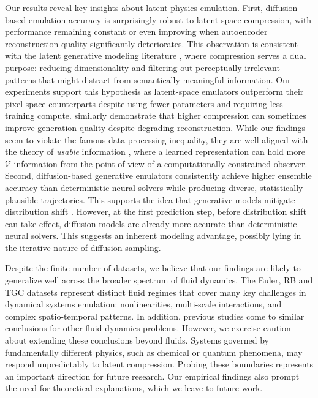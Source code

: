 Our results reveal key insights about latent physics emulation. First, diffusion-based emulation accuracy is surprisingly robust to latent-space compression, with performance remaining constant or even improving when autoencoder reconstruction quality significantly deteriorates. This observation is consistent with the latent generative modeling literature \cite{rombach2022highresolution, dieleman2025generative}, where compression serves a dual purpose: reducing dimensionality and filtering out perceptually irrelevant patterns that might distract from semantically meaningful information. Our experiments support this hypothesis as latent-space emulators outperform their pixel-space counterparts despite using fewer parameters and requiring less training compute. \textcite{yao2025reconstruction} similarly demonstrate that higher compression can sometimes improve generation quality despite degrading reconstruction. While our findings seem to violate the famous data processing inequality, they are well aligned with the theory of \emph{usable} information \cite{xu2020theory}, where a learned representation can hold more $\mathcal{V}$-information from the point of view of a computationally constrained observer. Second, diffusion-based generative emulators consistently achieve higher ensemble accuracy than deterministic neural solvers while producing diverse, statistically plausible trajectories. This supports the idea that generative models mitigate distribution shift \cite{lippe2023pderefiner, cachay2023dyffusion, kohl2024benchmarking, shysheya2024conditional, huang2024diffusionpde, price2025probabilistic}. However, at the first prediction step, before distribution shift can take effect, diffusion models are already more accurate than deterministic neural solvers. This suggests an inherent modeling advantage, possibly lying in the iterative nature of diffusion sampling.

Despite the finite number of datasets, we believe that our findings are likely to generalize well across the broader spectrum of fluid dynamics. The Euler, RB and TGC datasets represent distinct fluid regimes that cover many key challenges in dynamical systems emulation: nonlinearities, multi-scale interactions, and complex spatio-temporal patterns. In addition, previous studies \cite{gao2023prediff, zhou2025text2pde, du2024conditional, li2025generative} come to similar conclusions for other fluid dynamics problems. However, we exercise caution about extending these conclusions beyond fluids. Systems governed by fundamentally different physics, such as chemical or quantum phenomena, may respond unpredictably to latent compression. Probing these boundaries represents an important direction for future research. Our empirical findings also prompt the need for theoretical explanations, which we leave to future work.

